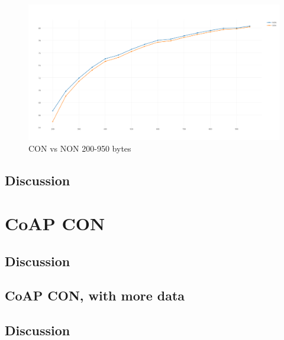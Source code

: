 \begin{figure}[ht]
    \centering
    \includegraphics[scale=0.35]{NON-CON_200-950GRAPH.png}    
    \caption{CON vs NON 200-950 bytes}
    \label{fig:CONvsNON200-950}
\end{figure}




\subsection{Discussion}




\section{CoAP CON}

\subsection{Discussion}

\subsection{CoAP CON, with more data}

\subsection{Discussion}


